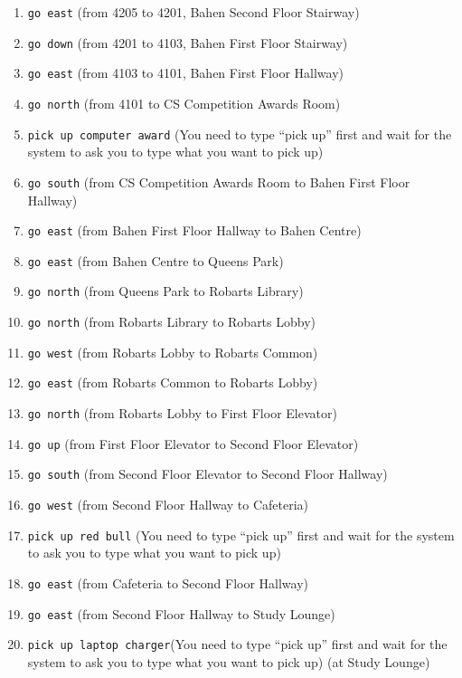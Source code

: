 \documentclass[11pt]{article}
\begin{document}
\begin{enumerate}
    \item \texttt{go east} \quad (from 4205 to 4201, Bahen Second Floor Stairway)
    \item \texttt{go down} \quad (from 4201 to 4103, Bahen First Floor Stairway)
    \item \texttt{go east} \quad (from 4103 to 4101, Bahen First Floor Hallway)
    \item \texttt{go north} \quad (from 4101 to CS Competition Awards Room)
    \item \texttt{pick up computer award} \quad (You need to type “pick up” first and wait for the system to ask you to type what you want to pick up)
    \item \texttt{go south} \quad (from CS Competition Awards Room to Bahen First Floor Hallway)
    \item \texttt{go east} \quad (from Bahen First Floor Hallway to Bahen Centre)
    \item \texttt{go east} \quad (from Bahen Centre to Queens Park)
    \item \texttt{go north} \quad (from Queens Park to Robarts Library)
    \item \texttt{go north} \quad (from Robarts Library to Robarts Lobby)
    \item \texttt{go west} \quad (from Robarts Lobby to Robarts Common)
    \item \texttt{go east} \quad (from Robarts Common to Robarts Lobby)
    \item \texttt{go north} \quad (from Robarts Lobby to First Floor Elevator)
    \item \texttt{go up} \quad (from First Floor Elevator to Second Floor Elevator)
    \item \texttt{go south} \quad (from Second Floor Elevator to Second Floor Hallway)
    \item \texttt{go west} \quad (from Second Floor Hallway to Cafeteria)
    \item \texttt{pick up red bull} \quad (You need to type “pick up” first and wait for the system to ask you to type what you want to pick up)
    \item \texttt{go east} \quad (from Cafeteria to Second Floor Hallway)
    \item \texttt{go east} \quad (from Second Floor Hallway to Study Lounge)
    \item \texttt{pick up laptop charger}\quad (You need to type “pick up” first and wait for the system to ask you to type what you want to pick up) \quad (at Study Lounge)

\end{enumerate}
\end{document}
